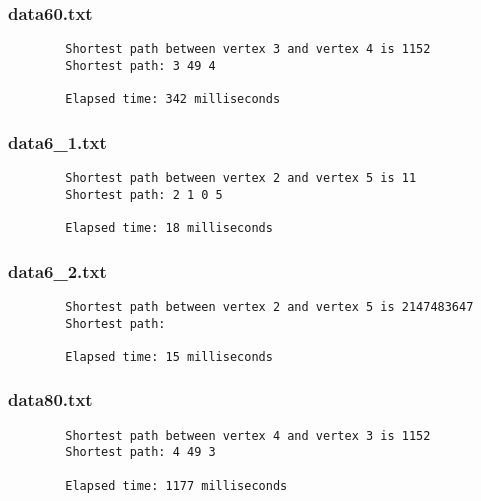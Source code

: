 \documentclass{article}
\begin{document}
    \subsubsection*{data60.txt}
    \begin{verbatim}
        Shortest path between vertex 3 and vertex 4 is 1152
        Shortest path: 3 49 4

        Elapsed time: 342 milliseconds
    \end{verbatim}

    \subsubsection*{data6\_1.txt}
    \begin{verbatim}
        Shortest path between vertex 2 and vertex 5 is 11
        Shortest path: 2 1 0 5

        Elapsed time: 18 milliseconds
    \end{verbatim}

    \subsubsection*{data6\_2.txt}
    \begin{verbatim}
        Shortest path between vertex 2 and vertex 5 is 2147483647
        Shortest path:

        Elapsed time: 15 milliseconds
    \end{verbatim}

    \subsubsection*{data80.txt}
    \begin{verbatim}
        Shortest path between vertex 4 and vertex 3 is 1152
        Shortest path: 4 49 3

        Elapsed time: 1177 milliseconds
    \end{verbatim}
\end{document}
